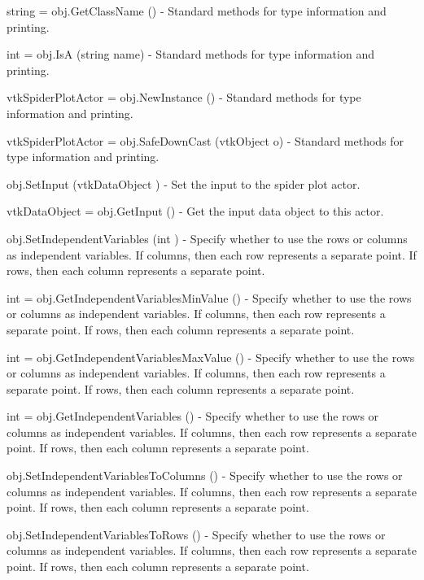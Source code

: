 \begin{DoxyItemize}
\item {\ttfamily string = obj.\-Get\-Class\-Name ()} -\/ Standard methods for type information and printing.  
\item {\ttfamily int = obj.\-Is\-A (string name)} -\/ Standard methods for type information and printing.  
\item {\ttfamily vtk\-Spider\-Plot\-Actor = obj.\-New\-Instance ()} -\/ Standard methods for type information and printing.  
\item {\ttfamily vtk\-Spider\-Plot\-Actor = obj.\-Safe\-Down\-Cast (vtk\-Object o)} -\/ Standard methods for type information and printing.  
\item {\ttfamily obj.\-Set\-Input (vtk\-Data\-Object )} -\/ Set the input to the spider plot actor.  
\item {\ttfamily vtk\-Data\-Object = obj.\-Get\-Input ()} -\/ Get the input data object to this actor.  
\item {\ttfamily obj.\-Set\-Independent\-Variables (int )} -\/ Specify whether to use the rows or columns as independent variables. If columns, then each row represents a separate point. If rows, then each column represents a separate point.  
\item {\ttfamily int = obj.\-Get\-Independent\-Variables\-Min\-Value ()} -\/ Specify whether to use the rows or columns as independent variables. If columns, then each row represents a separate point. If rows, then each column represents a separate point.  
\item {\ttfamily int = obj.\-Get\-Independent\-Variables\-Max\-Value ()} -\/ Specify whether to use the rows or columns as independent variables. If columns, then each row represents a separate point. If rows, then each column represents a separate point.  
\item {\ttfamily int = obj.\-Get\-Independent\-Variables ()} -\/ Specify whether to use the rows or columns as independent variables. If columns, then each row represents a separate point. If rows, then each column represents a separate point.  
\item {\ttfamily obj.\-Set\-Independent\-Variables\-To\-Columns ()} -\/ Specify whether to use the rows or columns as independent variables. If columns, then each row represents a separate point. If rows, then each column represents a separate point.  
\item {\ttfamily obj.\-Set\-Independent\-Variables\-To\-Rows ()} -\/ Specify whether to use the rows or columns as independent variables. If columns, then each row represents a separate point. If rows, then each column represents a separate point.  

\end{DoxyItemize}
